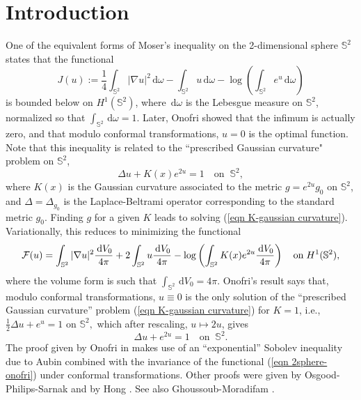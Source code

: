 \documentclass[10pt]{article}
\numberwithin{equation}{section}
\theoremstyle{plain}
\theoremstyle{definition}
\theoremstyle{remark}
\newcommand\s{{\mathbb S}}
\newcommand\dd{\,\mbox{d} }
\def\F{{\cal F}}
\begin{document}
\section{Introduction}
One of the equivalent forms of Moser's inequality \cite{moser} on the 2-dimensional sphere $\s^2$ states that the functional 
\begin{equation}\label{eqn 2sphere-onofri}
J(u):= \frac{1}{4}\int_{\s^2} |\nabla u|^2\dd\omega - \int_{\s^2} u\dd\omega- \log\left(\int_{\s^2} e^u\dd\omega\right) 
\end{equation}
is bounded below on $ H^1(\s^2)$,  
where 
$\dd\omega$ is the Lebesgue measure on $\s^2$, normalized so that $\int_{\s^2} \dd\omega=1$.  Later, Onofri \cite{onofri} showed that the infimum is actually zero, and that modulo conformal transformations, $u=0$ is the optimal function. Note that this inequality 
is related to the ``prescribed Gaussian curvature" problem on $\s^2$, 
\begin{equation}\label{eqn K-gaussian curvature}
\Delta u + K(x)e^{2u} =1 \quad \mbox{on} \;\; \s^2,
\end{equation}
where $K(x)$ is the Gaussian curvature associated to the metric $g=e^{2u}g_0$ on $\s^2$, and $\Delta = \Delta_{g_0}$ is the Laplace-Beltrami operator corresponding to the standard metric $g_0$. Finding $g$ for a given $K$ leads to solving (\ref{eqn K-gaussian curvature}). Variationally, this reduces to minimizing the functional 
\begin{equation}\label{eqn1}
\F(u)=\int_{\s^2} |\nabla u|^2\frac{\dd V_0}{4\pi} + 2\int_{\s^2} u\frac{\dd V_0}{4\pi} - \log\left(\int_{\s^2} K(x)e^{2u}\frac{\dd V_0}{4\pi}\right) \quad {\rm on}\;  H^1(\s^2),
\end{equation}
where the volume form is such that $\int_{\s^2} \dd V_0=4\pi$.  Onofri's result says that, modulo conformal transformations, $u\equiv 0$ is the only solution of the ``prescribed Gaussian curvature'' problem (\ref{eqn K-gaussian curvature}) for $K=1$, i.e., 
$\frac{1}{2}\Delta u + e^u = 1$ on $ \s^2, $
which after rescaling, $u\mapsto 2u$,  gives
\begin{equation}\label{eqn 2-gaussian curvature}
\Delta u + e^{2u} = 1 \quad \mbox{on} \;\; \s^2. 
\end{equation}
The proof given by Onofri in \cite{onofri} makes use of an ``exponential'' Sobolev inequality due to Aubin \cite{aubin} combined with the invariance of the functional  (\ref{eqn 2sphere-onofri}) under conformal transformations. Other proofs were given by Osgood-Philips-Sarnak \cite{OPS} and by Hong \cite{hong}. See also Ghoussoub-Moradifam \cite{GM}.
\end{document}
